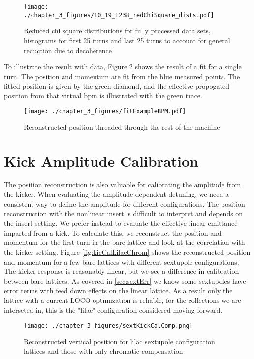 \begin{figure}
    \centering
    \texttt{[image: ./chapter\_3\_figures/10\_19\_t238\_redChiSquare\_dists.pdf]}
    \caption{Reduced chi square distributions for fully processed data sets, histograms for first 25 turns and last 25 turns to account for general reduction due to decoherence}
    \label{fig:redChiDists}
\end{figure}

To illustrate the result with data, Figure \ref{fig:fitThread} shows the result of a fit for a single turn. The position and momentum are fit from the blue measured points. The fitted position is given by the green diamond, and the effective propogated position from that virtual bpm is illustrated with the green trace.

\begin{figure}
    \centering
    \texttt{[image: ./chapter\_3\_figures/fitExampleBPM.pdf]}
    \caption{Reconstructed position threaded through the rest of the machine}
    \label{fig:fitThread}
\end{figure}

\section{Kick Amplitude Calibration} \label{sec:kickAmpCal}
The position reconstruction is also valuable for calibrating the amplitude from the kicker. When evaluating the amplitude dependent detuning, we need a consistent way to define the amplitude for different configurations. The position reconstruction with the nonlinear insert is difficult to interpret and depends on the insert setting. We prefer instead to evaluate the effective linear emittance imparted from a kick. To calculate this, we reconstruct the position and momentum for the first turn in the bare lattice and look at the correlation with the kicker setting. Figure \ref{fig:kicCalLilacChrom} shows the reconstructed position and momentum for a few bare lattices with different sextupole configurations. The kicker response is reasonably linear, but we see a difference in calibration between bare lattices. As covered in \ref{sec:sextErr} we know some sextupoles have error terms with feed down effects on the linear lattice. As a result only the lattice with a current LOCO optimization is reliable, for the collections we are interseted in, this is the "lilac" configuration considered moving forward.


\begin{figure}
    \centering
    \texttt{[image: ./chapter\_3\_figures/sextKickCalComp.png]}
    \caption{Reconstructed vertical position for lilac sextupole configuration lattices and those with only chromatic compensation}
    \label{fig:kickCalLilacChrom}
\end{figure}

